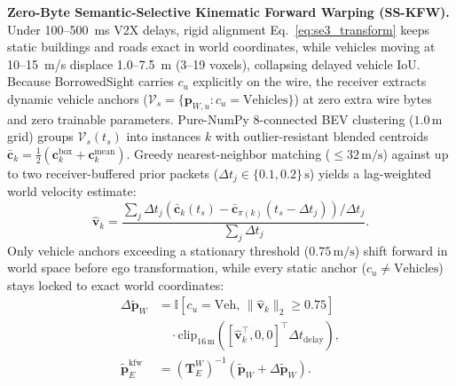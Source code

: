 \documentclass[journal]{IEEEtran}
\begin{document}
\textbf{Zero-Byte Semantic-Selective Kinematic Forward Warping (SS-KFW).} Under 100--500~ms V2X delays, rigid alignment Eq.~\eqref{eq:se3_transform} keeps static buildings and roads exact in world coordinates, while vehicles moving at 10--15~m/s displace 1.0--7.5~m (3--19 voxels), collapsing delayed vehicle IoU. Because BorrowedSight carries $c_u$ explicitly on the wire, the receiver extracts dynamic vehicle anchors ($\mathcal{V}_s = \{\mathbf{p}_{W,u} : c_u = \mathrm{Vehicles}\}$) at zero extra wire bytes and zero trainable parameters. Pure-NumPy 8-connected BEV clustering ($1.0\,\mathrm{m}$ grid) groups $\mathcal{V}_s(t_s)$ into instances $k$ with outlier-resistant blended centroids $\bar{\mathbf{c}}_k = \tfrac{1}{2}(\mathbf{c}_k^{\mathrm{box}} + \mathbf{c}_k^{\mathrm{mean}})$. Greedy nearest-neighbor matching ($\le 32\,\mathrm{m/s}$) against up to two receiver-buffered prior packets ($\Delta t_j \in \{0.1, 0.2\}\,\mathrm{s}$) yields a lag-weighted world velocity estimate:
\begin{equation}
\hat{\mathbf{v}}_k = \frac{\sum_{j} \Delta t_j \left(\bar{\mathbf{c}}_k(t_s) - \bar{\mathbf{c}}_{\pi(k)}(t_s - \Delta t_j)\right) / \Delta t_j}{\sum_{j} \Delta t_j}.
\label{eq:sskfw_vel}
\end{equation}
Only vehicle anchors exceeding a stationary threshold ($0.75\,\mathrm{m/s}$) shift forward in world space before ego transformation, while every static anchor ($c_u \neq \mathrm{Vehicles}$) stays locked to exact world coordinates:
\begin{equation}
\begin{aligned}
\Delta \tilde{\mathbf{p}}_W &= \mathbb{I}\!\left[c_u = \mathrm{Veh},\, \|\hat{\mathbf{v}}_k\|_2 \ge 0.75\right] \\
&\quad \cdot \mathrm{clip}_{16\,\mathrm{m}}\!\left([\hat{\mathbf{v}}_k^\top, 0, 0]^\top \Delta t_{\mathrm{delay}}\right), \\
\tilde{\mathbf{p}}_E^{\mathrm{kfw}} &= \left(\mathbf{T}_E^W\right)^{-1}\!\left(\tilde{\mathbf{p}}_W + \Delta \tilde{\mathbf{p}}_W\right).
\end{aligned}
\label{eq:sskfw_warp}
\end{equation}
\end{document}
